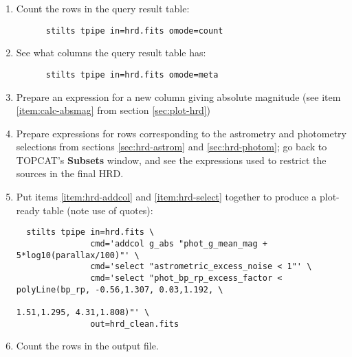 \documentclass{article}
\newcommand{\lab}[1]{{\bf #1}}
\begin{document}
\begin{enumerate}
\item Count the rows in the query result table:
      \begin{verbatim}
      stilts tpipe in=hrd.fits omode=count
      \end{verbatim}
      \vspace*{-3ex}
\item See what columns the query result table has:
      \begin{verbatim}
      stilts tpipe in=hrd.fits omode=meta
      \end{verbatim}
      \vspace*{-3ex}
\item Prepare an expression for a new column giving absolute magnitude
      (see item \ref{item:calc-absmag} from section \ref{sec:plot-hrd})
      \label{item:hrd-addcol}
\item Prepare expressions for rows corresponding to the
      astrometry and photometry selections
      from sections \ref{sec:hrd-astrom} and \ref{sec:hrd-photom};
      go back to TOPCAT's \lab{Subsets} window, and see the expressions
      used to restrict the sources in the final HRD.
      \label{item:hrd-select}
\item Put items \ref{item:hrd-addcol} and \ref{item:hrd-select} together
      to produce a plot-ready table (note use of quotes):
      \begin{verbatim}
  stilts tpipe in=hrd.fits \
               cmd='addcol g_abs "phot_g_mean_mag + 5*log10(parallax/100)"' \
               cmd='select "astrometric_excess_noise < 1"' \
               cmd='select "phot_bp_rp_excess_factor < polyLine(bp_rp, -0.56,1.307, 0.03,1.192, \
                                                                       1.51,1.295, 4.31,1.808)"' \
               out=hrd_clean.fits
      \end{verbatim}
      \vspace*{-3ex}
\item Count the rows in the output file.
\end{enumerate}
\end{document}
